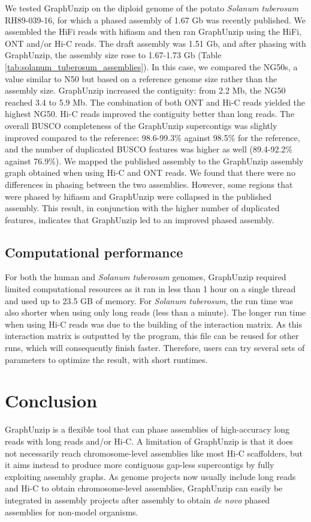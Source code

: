 We tested GraphUnzip on the diploid genome of the potato \textit{Solanum tuberosum} RH89-039-16, for which a phased assembly of 1.67 Gb \cite{potato} was recently published. We assembled the HiFi reads with hifiasm and then ran GraphUnzip using the HiFi, ONT and/or Hi-C reads. The draft assembly was 1.51 Gb, and after phasing with GraphUnzip, the assembly size rose to 1.67-1.73 Gb (Table \ref{tab:solanum_tuberosum_assemblies}). In this case, we compared the NG50s, a value similar to N50 but based on a reference genome size rather than the assembly size. GraphUnzip increased the contiguity: from 2.2 Mb, the NG50 reached 3.4 to 5.9 Mb. The combination of both ONT and Hi-C reads yielded the highest NG50. Hi-C reads improved the contiguity better than long reads. The overall BUSCO completeness of the GraphUnzip supercontigs was slightly improved compared to the reference: 98.6-99.3\% against 98.5\% for the reference, and the number of duplicated BUSCO features was higher as well (89.4-92.2\% against 76.9\%). We mapped the published assembly to the GraphUnzip assembly graph obtained when using Hi-C and ONT reads. We found that there were no differences in phasing between the two assemblies. However, some regions that were phased by hifiasm and GraphUnzip were collapsed in the published assembly. This result, in conjunction with the higher number of duplicated features, indicates that GraphUnzip led to an improved phased assembly. \\

\subsection{Computational performance}

For both the human and \textit{Solanum tuberosum} genomes, GraphUnzip required limited computational resources as it ran in less than 1 hour on a single thread and used up to 23.5 GB of memory. For \textit{Solanum tuberosum}, the run time was also shorter when using only long reads (less than a minute). The longer run time when using Hi-C reads was due to the building of the interaction matrix. As this interaction matrix is outputted by the program, this file can be reused for other runs, which will consequently finish faster. Therefore, users can try several sets of parameters to optimize the result, with short runtimes. \\

\section{Conclusion}

GraphUnzip is a flexible tool that can phase assemblies of high-accuracy long reads with long reads and/or Hi-C. A limitation of GraphUnzip is that it does not necessarily reach chromosome-level assemblies like most Hi-C scaffolders, but it aims instead to produce more contiguous gap-less supercontigs by fully exploiting assembly graphs. As genome projects now usually include long reads and Hi-C to obtain chromosome-level assemblies, GraphUnzip can easily be integrated in assembly projects after assembly to obtain \textit{de novo} phased assemblies for non-model organisms. \\